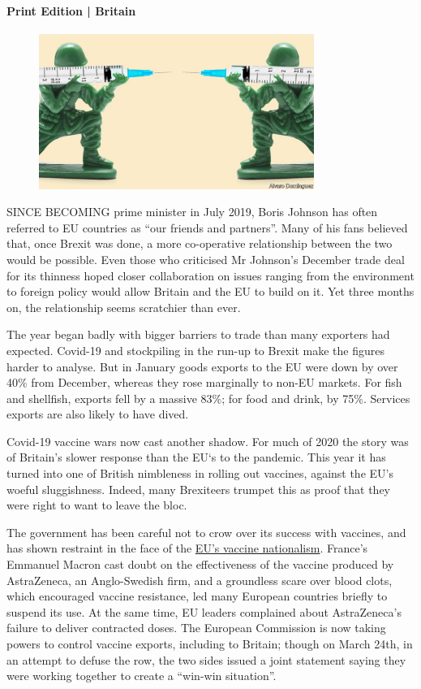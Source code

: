 \documentclass{article}
\begin{document}
\paragraph{Print Edition | Britain  \quad \color{gray}{Mar 27th 2021 }}
\begin{figure}[h]
\centering
\includegraphics[width=0.8\textwidth]{images/20210327_BRD001_0.jpg}
\end{figure}
\lettrine{S}INCE BECOMING prime minister in July 2019, Boris Johnson has often referred to EU countries as ``our friends and partners''. Many of his fans believed that, once Brexit was done, a more co-operative relationship between the two would be possible. Even those who criticised Mr Johnson's December trade deal for its thinness hoped closer collaboration on issues ranging from the environment to foreign policy would allow Britain and the EU to build on it. Yet three months on, the relationship seems scratchier than ever. 

The year began badly with bigger barriers to trade than many exporters had expected. Covid-19 and stockpiling in the run-up to Brexit make the figures harder to analyse. But in January goods exports to the EU were down by over 40\% from December, whereas they rose marginally to non-EU markets. For fish and shellfish, exports fell by a massive 83\%; for food and drink, by 75\%. Services exports are also likely to have dived. 

Covid-19 vaccine wars now cast another shadow. For much of 2020 the story was of Britain's slower response than the EU`s to the pandemic. This year it has turned into one of British nimbleness in rolling out vaccines, against the EU's woeful sluggishness. Indeed, many Brexiteers trumpet this as proof that they were right to want to leave the bloc. 

The government has been careful not to crow over its success with vaccines, and has shown restraint in the face of the \href{/node/21799718}{EU's vaccine nationalism}. France's Emmanuel Macron cast doubt on the effectiveness of the vaccine produced by AstraZeneca, an Anglo-Swedish firm, and a groundless scare over blood clots, which encouraged vaccine resistance, led many European countries briefly to suspend its use. At the same time, EU leaders complained about AstraZeneca's failure to deliver contracted doses. The European Commission is now taking powers to control vaccine exports, including to Britain; though on March 24th, in an attempt to defuse the row, the two sides issued a joint statement saying they were working together to create a ``win-win situation''. 
\end{document}
